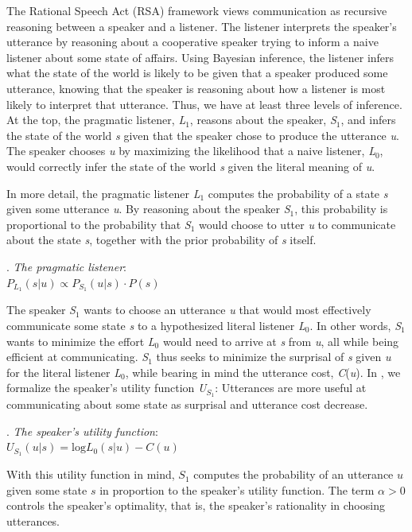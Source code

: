 \documentclass[linguex]{sp}
\begin{document}
The Rational Speech Act (RSA) framework views communication as recursive reasoning between a speaker and a listener. The listener interprets the speaker's utterance by reasoning about a cooperative speaker trying to inform a naive listener about some state of affairs. Using Bayesian inference, the listener infers what the state of the world is likely to be given that a speaker produced some utterance, knowing that the speaker is reasoning about how a listener is most likely to interpret that utterance. Thus, we have at least three levels of inference. At the top, the pragmatic listener, \emph{L}$_{1}$, reasons about the speaker, \emph{S}$_{1}$, and infers the state of the world \emph{s} given that the speaker chose to produce the utterance \emph{u}. The speaker chooses \emph{u} by maximizing the likelihood that a naive listener, \emph{L}$_{0}$, would correctly infer the state of the world \emph{s} given the literal meaning of \emph{u}.

In more detail, the pragmatic listener \emph{L}$_{1}$ computes the probability of a state \emph{s} given some utterance \emph{u}. By reasoning about the speaker \emph{S}$_{1}$, this probability is proportional to the probability that \emph{S}$_{1}$ would choose to utter \emph{u} to communicate about the state \emph{s}, together with the prior probability of \emph{s} itself.

\ex. \emph{The pragmatic listener}:\\
$P_{L_{1}}(s|u) \propto P_{S_{1}}(u|s) \cdot P(s)$

The speaker \emph{S}$_{1}$ wants to choose an utterance \emph{u} that would most effectively communicate some state \emph{s} to a hypothesized literal listener \emph{L}$_{0}$. In other words, \emph{S}$_{1}$ wants to minimize the effort \emph{L}$_{0}$ would need to arrive at \emph{s} from \emph{u}, all while being efficient at communicating. \emph{S}$_{1}$ thus seeks to minimize the surprisal of \emph{s} given \emph{u} for the literal listener \emph{L}$_{0}$, while bearing in mind the utterance cost, \emph{C}(\emph{u}). In \Next, we formalize the speaker's utility function \emph{U}$_{S_{1}}$: Utterances are more useful at communicating about some state as surprisal and utterance cost decrease.

\ex. \emph{The speaker's utility function}:\\
$U_{S_{1}}(u|s) = \textrm{log}L_{0}(s|u) - C(u)$

With this utility function in mind, $S_{1}$ computes the probability of an utterance $u$ given some state $s$ in proportion to the speaker's utility function. The term $\alpha > 0$ controls the speaker's optimality, that is, the speaker's rationality in choosing utterances.
\end{document}
